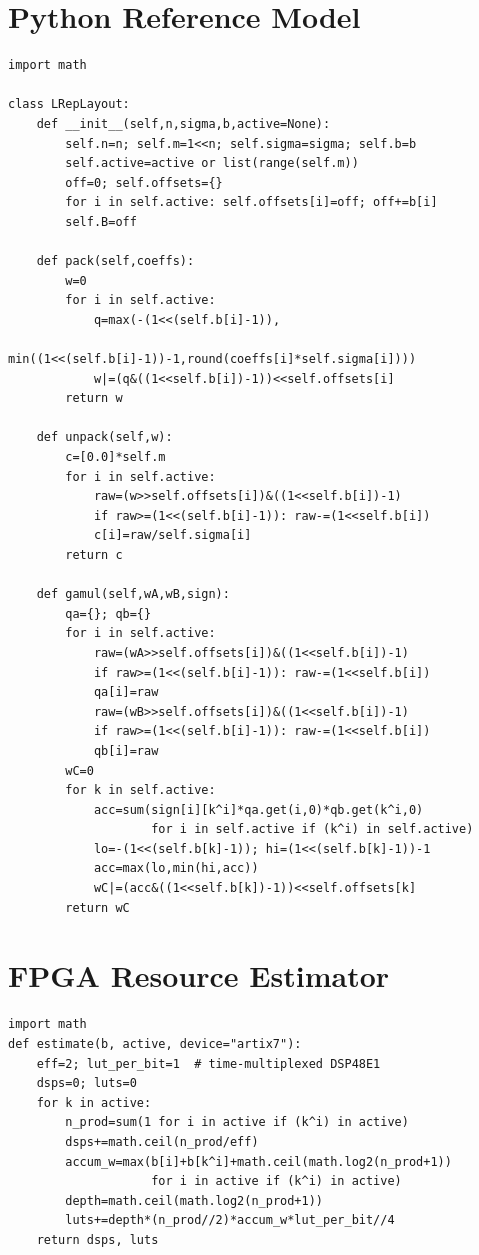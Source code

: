 \documentclass[11pt,a4paper]{article}
\theoremstyle{definition}
\theoremstyle{plain}
\theoremstyle{remark}
\begin{document}
\section{Python Reference Model}
\label{app:sim}
\begin{lstlisting}[caption={Python L-Rep reference model (arbitrary precision)},
  label=lst:python]
import math

class LRepLayout:
    def __init__(self,n,sigma,b,active=None):
        self.n=n; self.m=1<<n; self.sigma=sigma; self.b=b
        self.active=active or list(range(self.m))
        off=0; self.offsets={}
        for i in self.active: self.offsets[i]=off; off+=b[i]
        self.B=off

    def pack(self,coeffs):
        w=0
        for i in self.active:
            q=max(-(1<<(self.b[i]-1)),
                  min((1<<(self.b[i]-1))-1,round(coeffs[i]*self.sigma[i])))
            w|=(q&((1<<self.b[i])-1))<<self.offsets[i]
        return w

    def unpack(self,w):
        c=[0.0]*self.m
        for i in self.active:
            raw=(w>>self.offsets[i])&((1<<self.b[i])-1)
            if raw>=(1<<(self.b[i]-1)): raw-=(1<<self.b[i])
            c[i]=raw/self.sigma[i]
        return c

    def gamul(self,wA,wB,sign):
        qa={}; qb={}
        for i in self.active:
            raw=(wA>>self.offsets[i])&((1<<self.b[i])-1)
            if raw>=(1<<(self.b[i]-1)): raw-=(1<<self.b[i])
            qa[i]=raw
            raw=(wB>>self.offsets[i])&((1<<self.b[i])-1)
            if raw>=(1<<(self.b[i]-1)): raw-=(1<<self.b[i])
            qb[i]=raw
        wC=0
        for k in self.active:
            acc=sum(sign[i][k^i]*qa.get(i,0)*qb.get(k^i,0)
                    for i in self.active if (k^i) in self.active)
            lo=-(1<<(self.b[k]-1)); hi=(1<<(self.b[k]-1))-1
            acc=max(lo,min(hi,acc))
            wC|=(acc&((1<<self.b[k])-1))<<self.offsets[k]
        return wC
\end{lstlisting}

\section{FPGA Resource Estimator}
\label{app:dsp}
\begin{lstlisting}[caption={Corrected resource estimator (time-multiplexed DSP)},
  label=lst:fpga]
import math
def estimate(b, active, device="artix7"):
    eff=2; lut_per_bit=1  # time-multiplexed DSP48E1
    dsps=0; luts=0
    for k in active:
        n_prod=sum(1 for i in active if (k^i) in active)
        dsps+=math.ceil(n_prod/eff)
        accum_w=max(b[i]+b[k^i]+math.ceil(math.log2(n_prod+1))
                    for i in active if (k^i) in active)
        depth=math.ceil(math.log2(n_prod+1))
        luts+=depth*(n_prod//2)*accum_w*lut_per_bit//4
    return dsps, luts
\end{lstlisting}
\end{document}
